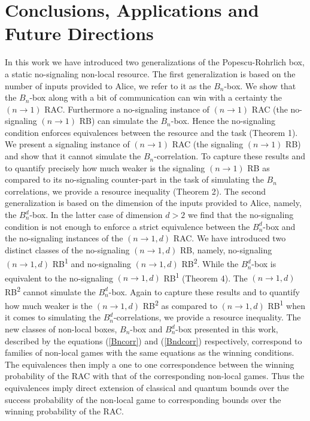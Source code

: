 \documentclass[%
 reprint,
 amsmath,amssymb,
 aps,
]{revtex4-1}
\begin{document}
\section{Conclusions, Applications and Future Directions}
In this work we have introduced two generalizations of the Popescu-Rohrlich box, a static no-signaling non-local resource. The first generalization is based on the number of inputs provided to Alice, we refer to it as the $B_n$-box. We show that the $B_n$-box along with a bit of communication can win with a certainty the $(n\rightarrow 1)$ RAC. Furthermore a no-signaling instance of $(n\rightarrow 1)$ RAC (the no-signaling $(n\rightarrow 1)$  RB) can simulate the $B_n$-box. Hence the no-signaling condition enforces equivalences between the resource and the task (Theorem 1). We present a signaling instance of $(n\rightarrow 1)$ RAC (the signaling $(n\rightarrow 1)$  RB) and show that it cannot simulate the $B_n$-correlation. To capture these results and to quantify precisely how much weaker is the signaling $(n\rightarrow 1)$  RB as compared to its no-signaling counter-part in the task of simulating the $B_n$ correlations, we provide a resource inequality (Theorem 2). The second generalization is based on the dimension of the inputs provided to Alice, namely, the $B_n^d$-box. In the latter case of dimension $d>2$ we find that the no-signaling condition is not enough to enforce a strict equivalence between the $B_n^d$-box and the no-signaling instances of the $(n\rightarrow1,d)$ RAC. We have introduced two distinct classes of the no-signaling $(n\rightarrow1,d)$ RB, namely, no-signaling $(n\rightarrow1,d)$ RB\textsuperscript{1} and no-signaling $(n\rightarrow1,d)$ RB\textsuperscript{2}. While the $B_n^d$-box is equivalent to the no-signaling $(n\rightarrow1,d)$ RB\textsuperscript{1} (Theorem 4). The $(n\rightarrow1,d)$ RB\textsuperscript{2} cannot simulate the $B_n^d$-box. Again to capture these results and to quantify how much weaker is the $(n\rightarrow1,d)$ RB\textsuperscript{2} as compared to $(n\rightarrow1,d)$ RB\textsuperscript{1} when it comes to simulating the $B_n^d$-correlations, we provide a resource inequality. The new classes of non-local boxes, $B_n$-box and $B_n^d$-box presented in this work, described by the equations (\ref{Bncorr}) and (\ref{Bndcorr}) respectively, correspond to families of non-local games with the same equations as the winning conditions. The equivalences then imply a one to one correspondence between the winning probability of the RAC with that of the corresponding non-local games. Thus the equivalences imply direct extension of classical and quantum bounds over the success probability of the non-local game to corresponding bounds over the winning probability of the RAC.\\
\end{document}
